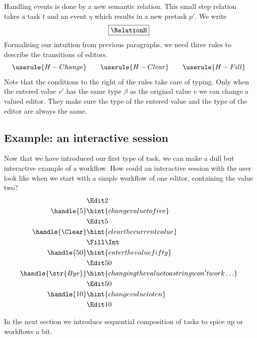 Handling events is done by a new semantic relation.
This small step relation takes a task $t$ and an event $\eta$ which results in a new pretask $p'$.
We write
\begin{equation*}
  \boxed{\RelationH}
\end{equation*}
Formalising our intuition from previous paragraphs,
we need three rules to describe the transitions of editors.
\begin{equation*}
  \userule{H-Change} \qquad \userule{H-Clear} \qquad \userule{H-Fill}
\end{equation*}
Note that the conditions to the right of the rules take care of typing.
Only when the entered value $v'$ has the same type $\beta$ as the original value $v$ we can change a valued editor.
They make sure the type of the entered value and the type of the editor are always the same.


\subsection{Example: an interactive session}

Now that we have introduced our first type of task,
we can make a dull but interactive example of a workflow.
How could an interactive session with the user look like when we start with a simple workflow of one editor,
containing the value two?
\begin{align*}
    & \Edit 2 \\
  \handle{5} & \hint{change value to five} \\
    & \Edit 5 \\
  \handle{\Clear} & \hint{clear the current value} \\
    & \Fill \Int \\
  \handle{50} & \hint{enter the value fifty} \\
    & \Edit 50 \\
  \handle{\str{Bye}} & \hint{changing the value to a string won't work\ldots} \\
    & \Edit 50 \\
  \handle{10} & \hint{change value to ten} \\
    & \Edit 10
\end{align*}

In the next section we introduce sequential composition of tasks to spice up or workflows a bit.
